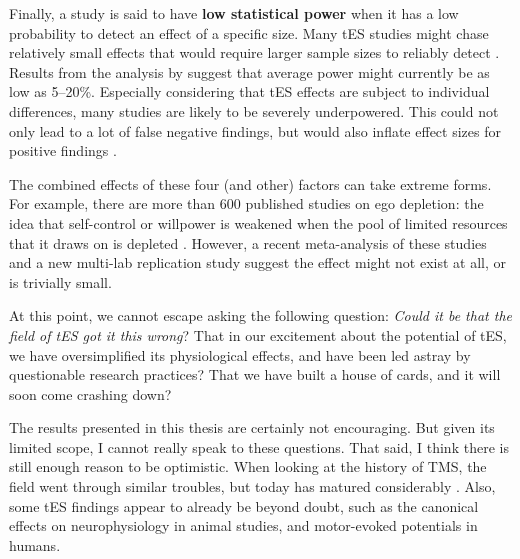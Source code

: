 \documentclass[11pt,english,]{memoir}
\begin{document}
Finally, a study is said to have \textbf{low statistical power} when it has a low probability to detect an effect of a specific size. Many tES studies might chase relatively small effects that would require larger sample sizes to reliably detect \autocite{Minarik2016}. Results from the analysis by \textcite{Medina2017} suggest that average power might currently be as low as 5--20\%. Especially considering that tES effects are subject to individual differences, many studies are likely to be severely underpowered. This could not only lead to a lot of false negative findings, but would also inflate effect sizes for positive findings \autocite{Button2013}.

The combined effects of these four (and other) factors can take extreme forms. For example, there are more than 600 published studies on ego depletion: the idea that self-control or willpower is weakened when the pool of limited resources that it draws on is depleted \autocite{Inzlicht2012}. However, a recent meta-analysis of these studies \autocite{Carter2015} and a new multi-lab replication study \autocite{Hagger2016} suggest the effect might not exist at all, or is trivially small.

At this point, we cannot escape asking the following question: \emph{Could it be that the field of tES got it this wrong}? That in our excitement about the potential of tES, we have oversimplified its physiological effects, and have been led astray by questionable research practices? That we have built a house of cards, and it will soon come crashing down?

The results presented in this thesis are certainly not encouraging. But given its limited scope, I cannot really speak to these questions. That said, I think there is still enough reason to be optimistic. When looking at the history of TMS, the field went through similar troubles, but today has matured considerably \autocite{Parkin2015}. Also, some tES findings appear to already be beyond doubt, such as the canonical effects on neurophysiology in animal studies, and motor-evoked potentials in humans.
\end{document}
